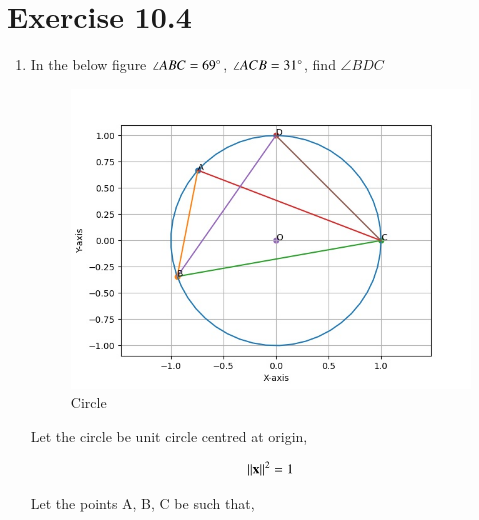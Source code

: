 \documentclass[journal,12pt,twocolumn]{IEEEtran}
\begin{document}
\section{Exercise 10.4}
\begin{enumerate}
	\item In the below figure $\angle ABC = 69\degree$, $\angle ACB = 31\degree$, find $\angle BDC$
\begin{figure}[ht]
	\centering
	\includegraphics[width = \columnwidth]{figs/plot.jpg}
	\caption{Circle}
	\label{fig:1}
\end{figure}

Let the circle be unit circle centred at origin,

		\begin{align}
			\left\lVert\mathbf{x}\right\rVert^2 = 1
		\end{align}

Let the points A, B, C be such that,


\end{enumerate}
\end{document}
